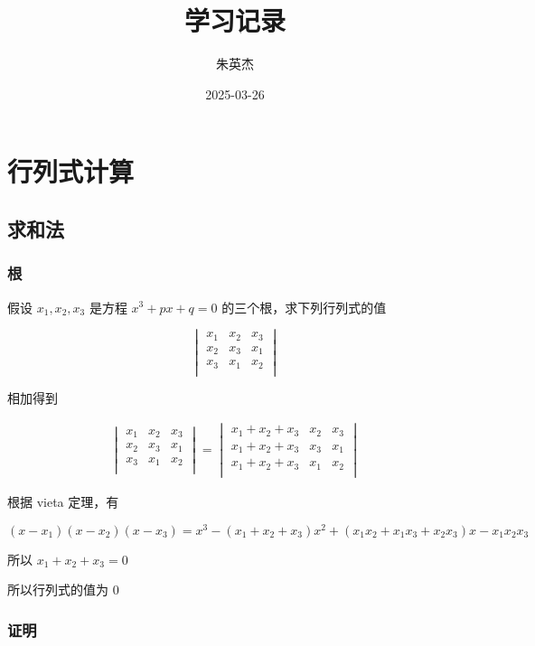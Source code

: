 \documentclass[12pt,a4paper]{ctexart}
\title{学习记录}
\author{朱英杰}
\date{2025-03-26}
\begin{document}
\maketitle
\tableofcontents


\section{行列式计算}

\subsection{求和法}

\subsubsection{根}

假设 $x_1, x_2, x_3$ 是方程 $x^3 + px + q = 0$ 的三个根，求下列行列式的值

\[
\begin{vmatrix}
    x_1 & x_2 & x_3\\
    x_2 & x_3 & x_1\\
    x_3 & x_1 & x_2\\
\end{vmatrix}
\]

相加得到

\begin{align*}
\begin{vmatrix}
    x_1 & x_2 & x_3\\
    x_2 & x_3 & x_1\\
    x_3 & x_1 & x_2\\
\end{vmatrix} = \begin{vmatrix}
    x_1 + x_2 + x_3 & x_2 & x_3\\
    x_1 + x_2 + x_3 & x_3 & x_1\\
    x_1 + x_2 + x_3 & x_1 & x_2\\
\end{vmatrix}
\end{align*}

根据 vieta 定理，有

\[
(x-x_1)(x-x_2)(x-x_3) = x^3 - (x_1 + x_2 + x_3)x^2 + (x_1x_2 + x_1x_3 + x_2x_3)x - x_1x_2x_3
\]

所以 $x_1 + x_2 + x_3 = 0$

所以行列式的值为 $0$

\subsubsection{证明}
\end{document}
